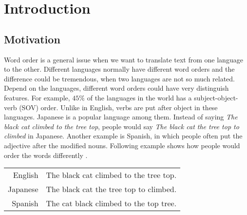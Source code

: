 
\chapter{Introduction}
\label{ch:Introduction}

\section{Motivation}
\label{ch:Introduction:sec:Motivation}

Word order is a general issue when we want to translate text from one language to the other. Different languages normally have different word orders and the difference could be tremendous, when two languages are not so much related. Depend on the languages, different word orders could have very distinguish features. For example, $45\%$ of the languages in the world has a subject-object-verb (SOV) order. Unlike in English, verbs are put after object in these languages. Japanese is a popular language among them. Instead of saying \emph{The black cat climbed to the tree top}, people would say \emph{The black cat the tree top to climbed} in Japanese. Another example is Spanish, in which people often put the adjective after the modified nouns. Following example shows how people would order the words differently \citep{google}.


\begin{center}
\begin{tabular}{ r l }
English & The black cat climbed to the tree top. \\
Japanese & The black cat the tree top to climbed. \\
Spanish & The cat black climbed to the top tree. \\
\end{tabular}
\end{center}

